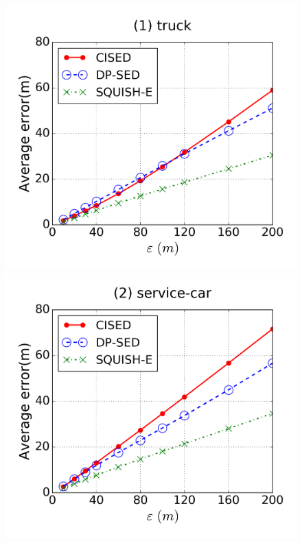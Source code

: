 \begin{figure}[tb]
\centering
\includegraphics[scale = 0.24]{figures/Exp-error-epsilon-truck.png}
\includegraphics[scale = 0.24]{figures/Exp-error-epsilon-service.png}

\end{figure}
